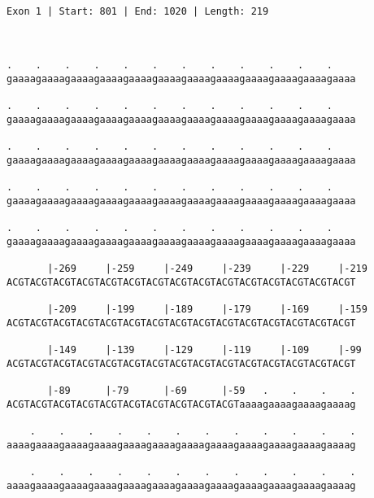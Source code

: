 \documentclass{article}
\begin{document}
 \begin{Verbatim}
 
Exon 1 | Start: 801 | End: 1020 | Length: 219



.    .    .    .    .    .    .    .    .    .    .    .    
gaaaagaaaagaaaagaaaagaaaagaaaagaaaagaaaagaaaagaaaagaaaagaaaa
                                                            
.    .    .    .    .    .    .    .    .    .    .    .    
gaaaagaaaagaaaagaaaagaaaagaaaagaaaagaaaagaaaagaaaagaaaagaaaa
                                                            
.    .    .    .    .    .    .    .    .    .    .    .    
gaaaagaaaagaaaagaaaagaaaagaaaagaaaagaaaagaaaagaaaagaaaagaaaa
                                                            
.    .    .    .    .    .    .    .    .    .    .    .    
gaaaagaaaagaaaagaaaagaaaagaaaagaaaagaaaagaaaagaaaagaaaagaaaa
                                                            
.    .    .    .    .    .    .    .    .    .    .    .    
gaaaagaaaagaaaagaaaagaaaagaaaagaaaagaaaagaaaagaaaagaaaagaaaa
                                                            
       |-269     |-259     |-249     |-239     |-229     |-219
ACGTACGTACGTACGTACGTACGTACGTACGTACGTACGTACGTACGTACGTACGTACGT
                                                            
       |-209     |-199     |-189     |-179     |-169     |-159
ACGTACGTACGTACGTACGTACGTACGTACGTACGTACGTACGTACGTACGTACGTACGT
                                                            
       |-149     |-139     |-129     |-119     |-109     |-99
ACGTACGTACGTACGTACGTACGTACGTACGTACGTACGTACGTACGTACGTACGTACGT
                                                            
       |-89      |-79      |-69      |-59   .    .    .    .
ACGTACGTACGTACGTACGTACGTACGTACGTACGTACGTaaaagaaaagaaaagaaaag
                                                            
    .    .    .    .    .    .    .    .    .    .    .    .
aaaagaaaagaaaagaaaagaaaagaaaagaaaagaaaagaaaagaaaagaaaagaaaag
                                                            
    .    .    .    .    .    .    .    .    .    .    .    .
aaaagaaaagaaaagaaaagaaaagaaaagaaaagaaaagaaaagaaaagaaaagaaaag
                                                            

\end{Verbatim}
\end{document}
